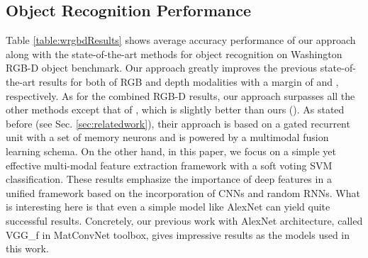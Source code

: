 \subsection{Object Recognition Performance} \label{sec:exp.objectRecognition}
Table \ref{table:wrgbdResults} shows average accuracy performance of our approach along with the state-of-the-art methods for object recognition on Washington RGB-D object benchmark. Our approach greatly improves the previous state-of-the-art results for both of RGB and depth modalities with a margin of  and , respectively. As for the combined RGB-D results, our approach surpasses all the other methods except that of \cite{Loghmani_RAL_2019}, which is slightly better than ours (). As stated before (see Sec. \ref{sec:relatedwork}), their approach is based on a gated recurrent unit with a set of memory neurons and is powered by a multimodal fusion learning schema. On the other hand, in this paper, we focus on a simple yet effective multi-modal feature extraction framework with a soft voting SVM classification. These results emphasize the importance of deep features in a unified framework based on the incorporation of CNNs and random RNNs. What is interesting here is that even a simple model like AlexNet can yield quite successful results. Concretely, our previous work \citep{Caglayan_ECCVW_2018} with AlexNet architecture, called VGG\_f in MatConvNet toolbox, gives impressive results as the models used in this work.
